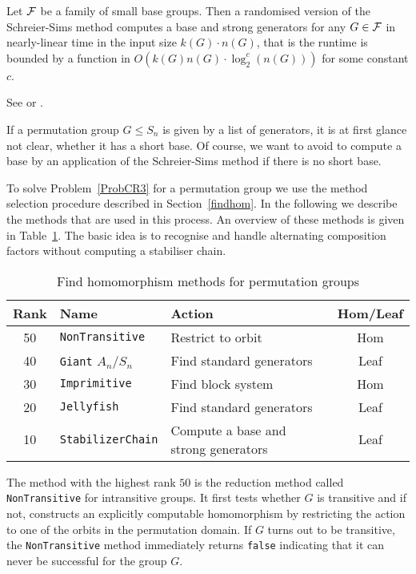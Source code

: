 \begin{Theo}
Let $\mathcal{F}$ be a family of small base groups. Then a randomised version
of the Schreier-Sims method computes a base and strong generators
for any $G \in \mathcal{F}$ in nearly-linear time in the input size $k(G)\cdot
n(G)$, that is the runtime is bounded by a function in
$O(k(G)n(G) \cdot \log^c_2(n(G)))$ for some constant $c$.
\end{Theo}
\proofbeg See \cite{nearlylin} or \cite[Theorem 4.5.5]{Ser}. \proofend

\medskip
If a permutation group $G \le S_n$ is given by a list of generators, it
is at first glance not clear, whether it has a short base. Of course,
we want to avoid to compute a base by an application of the Schreier-Sims
method if there is no short base.

To solve Problem~\ref{ProbCR3} for a permutation group we use the method
selection procedure described in Section~\ref{findhom}. In the following we
describe the methods that are used in this process. An overview of these 
methods is given in Table~\ref{permdb}. The basic idea is to recognise
and handle alternating composition factors without computing a stabiliser 
chain.

\begin{table}[ht]
\begin{center}
\begin{tabular}{|c|l|l|c|}
\hline
Rank & Name & Action & Hom/Leaf \\
\hline
\hline
50 & \texttt{NonTransitive} & Restrict to orbit & Hom \\
\hline
40 & \texttt{Giant} $A_n/S_n$ & Find standard generators & Leaf \\
\hline
30 & \texttt{Imprimitive} & Find block system & Hom \\
\hline
20 & \texttt{Jellyfish} & Find standard generators & Leaf \\
\hline
10 & \texttt{StabilizerChain} & Compute a base and strong generators & Leaf \\
\hline
\end{tabular}
\end{center}
\caption{Find homomorphism methods for permutation groups}
\label{permdb}
\end{table}

The method with the highest rank $50$ is the reduction method called
\texttt{NonTransitive} for intransitive groups. It first tests whether
$G$ is transitive and if not, constructs an explicitly
computable homomorphism by restricting the action to one of the orbits in the
permutation domain. If $G$ turns out to be transitive, the
\texttt{NonTransitive} method immediately returns \texttt{false}
indicating that it can never be successful for the group $G$.

